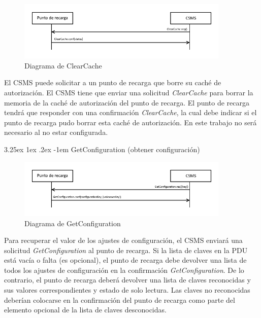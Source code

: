 \documentclass[12pt,a4paper,onecolumn,oneside]{report}
\makeatletter
\renewcommand\paragraph{\@startsection{paragraph}{5}{\z@}%
  {3.25ex \@plus1ex \@minus.2ex}%
  {-1em}%
  {\normalfont\normalsize\bfseries}}
\makeatother
\begin{document}
\begin{figure}[H] 
\centering
  \includegraphics[width=0.9\textwidth]{figuras/diagramaclearcache.png}
  \caption[Diagrama de \textit{ClearCache}]{Diagrama de ClearCache\\
  }
  \label{fig:diagramaclearcache}
\end{figure}

El CSMS puede solicitar a un punto de recarga que borre su caché de autorización. El CSMS tiene que enviar una solicitud \textit{ClearCache} para borrar la memoria de la caché de autorización del punto de recarga. El punto de recarga tendrá que responder con una confirmación \textit{ClearCache}, la cual debe indicar si el punto de recarga pudo borrar esta caché de autorización. En este trabajo no será necesario al no estar configurada.


\paragraph{GetConfiguration (obtener configuración)}
\label{GetConfiguration (obtener configuración)}



\begin{figure}[H] 
\centering
  \includegraphics[width=0.9\textwidth]{figuras/diagramagetconfiguration.png}
  \caption[Diagrama de \textit{GetConfiguration}]{Diagrama de GetConfiguration\\
  }
  \label{fig:diagramagetconfiguration}
\end{figure}


Para recuperar el valor de los ajustes de configuración, el CSMS enviará una solicitud \textit{GetConfiguration} al punto de recarga. Si la lista de claves en la PDU está vacía o falta (es opcional), el punto de recarga debe devolver una lista de todos los ajustes de configuración en la confirmación \textit{GetConfiguration}. De lo contrario, el punto de recarga deberá devolver una lista de claves reconocidas y sus valores correspondientes y estado de solo lectura. Las claves no reconocidas deberían colocarse en la confirmación del punto de recarga como parte del elemento opcional de la lista de claves desconocidas.
\end{document}
